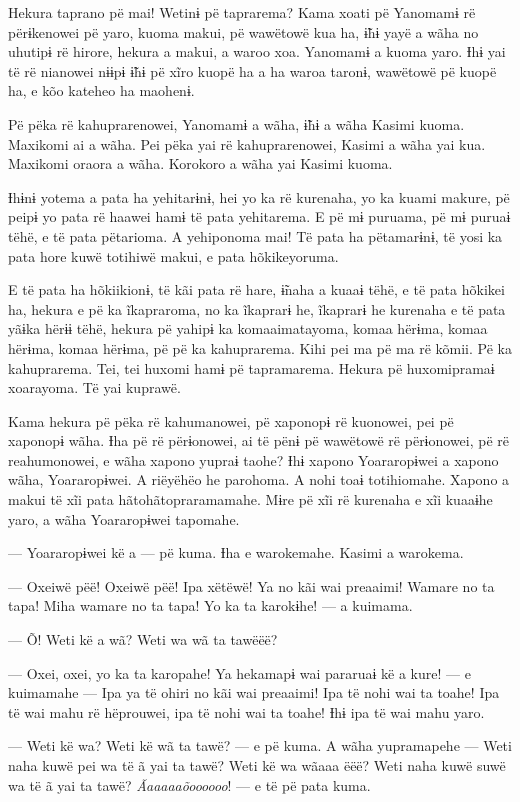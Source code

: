Hekura taprano pë mai! Wetinɨ pë taprarema? Kama xoati pë Yanomamɨ rë
përɨkenowei pë yaro, kuoma makui, pë wawëtowë kua ha, ɨ̃hɨ yayë a wãha no
uhutipɨ rë hirore, hekura a makui, a waroo xoa. Yanomamɨ a kuoma yaro.
Ɨhɨ yai të rë nianowei nɨɨpɨ ɨ̃hɨ pë xĩro kuopë ha a ha waroa taronɨ,
wawëtowë pë kuopë ha, e kõo kateheo ha maohenɨ. 

Pë pëka rë kahuprarenowei, Yanomamɨ a wãha, ɨ̃hɨ a wãha Kasimi kuoma.
Maxikomi ai a wãha. Pei pëka yai rë kahuprarenowei, Kasimi a wãha yai
kua. Maxikomi oraora a wãha. Korokoro a wãha yai Kasimi kuoma. 

Ɨhɨnɨ yotema a pata ha yehitarɨnɨ, hei yo ka rë kurenaha, yo ka kuami
makure, pë peipɨ yo pata rë haawei hamɨ të pata yehitarema. E pë mɨ
puruama, pë mɨ puruaɨ tëhë, e të pata pëtarioma. A yehiponoma mai! Të
pata ha pëtamarɨnɨ, të yosi ka pata hore kuwë totihiwë makui, e pata
hõkikeyoruma. 

E të pata ha hõkiikionɨ, të kãi pata rë hare, ɨ̃naha a kuaaɨ tëhë, e të
pata hõkikei ha, hekura e pë ka ĩkapraroma, no ka ĩkaprarɨ he, ĩkaprarɨ
he kurenaha e të pata yãɨka hërɨɨ tëhë, hekura pë yahipɨ ka
komaaimatayoma, komaa hërɨma, komaa hërɨma, komaa hërɨma, pë pë ka
kahuprarema. Kihi pei ma pë ma rë kõmii. Pë ka kahuprarema. Tei, tei
huxomi hamɨ pë tapramarema. Hekura pë huxomipramaɨ xoarayoma. Të yai
kuprawë. 

Kama hekura pë pëka rë kahumanowei, pë xaponopɨ rë kuonowei, pei pë
xaponopɨ wãha. Ɨha pë rë përɨonowei, ai të pënɨ pë wawëtowë rë
përɨonowei, pë rë reahumonowei, e wãha xapono yupraɨ taohe? Ɨhɨ xapono
Yoararopɨwei a xapono wãha, Yoararopɨwei. A riëyëhëo he parohoma. A nohi
toaɨ totihiomahe. Xapono a makui të xĩi pata hãtohãtopraramamahe. Mɨre
pë xĩi rë kurenaha e xĩi kuaaɨhe yaro, a wãha Yoararopɨwei tapomahe. 

--- Yoararopɨwei kë a --- pë kuma. Ɨha e warokemahe. Kasimi a warokema. 

--- Oxeiwë pëë! Oxeiwë pëë! Ipa xëtëwë! Ya no kãi wai preaaimi! Wamare
no ta tapa! Miha wamare no ta tapa! Yo ka ta karokɨhe! --- a kuimama. 

--- Õ! Weti kë a wã? Weti wa wã ta tawëëë?

--- Oxei, oxei, yo ka ta karopahe! Ya hekamapɨ wai pararuaɨ kë a kure!
--- e kuimamahe --- Ipa ya të ohiri no kãi wai preaaimi! Ipa të nohi wai
ta toahe! Ipa të wai mahu rë hëprouwei, ipa të nohi wai ta toahe! Ɨhɨ
ipa të wai mahu yaro. 

--- Weti kë wa? Weti kë wã ta tawë? --- e pë kuma. A wãha yupramapehe
--- Weti naha kuwë pei wa të ã yai ta tawë? Weti kë wa wãaaa ëëë? Weti
naha kuwë suwë wa të ã yai ta tawë? \textit{Ãaaaaaõoooooo}! --- e të pë pata
kuma. 

